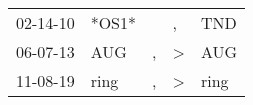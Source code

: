 \begin{supertabular}{p{0.07\textwidth}p{0.06\textwidth}p{0.02\textwidth}p{0.02\textwidth}p{0.06\textwidth}}
          02-14-10\textsuperscript{} &                            *OS1* &               &             , &            TND\textsuperscript{} \\
          06-07-13\textsuperscript{} &            AUG\textsuperscript{} &             , &  \textgreater &            AUG\textsuperscript{} \\
          11-08-19\textsuperscript{} &           ring\textsuperscript{} &             , &  \textgreater &           ring\textsuperscript{} \\
\end{supertabular}
